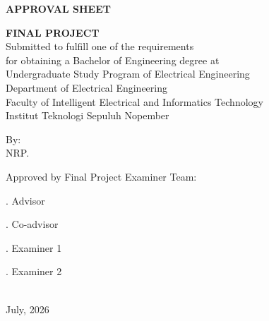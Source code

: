 \begin{center}
  \large
  \textbf{APPROVAL SHEET}
\end{center}

\thispagestyle{empty}

\begin{center}
  \textbf{\engtatitle{}}
\end{center}

\begingroup
\small

\begin{center}
  \textbf{FINAL PROJECT}
  \\Submitted to fulfill one of the requirements \\
  for obtaining a Bachelor of Engineering degree at \\
  Undergraduate Study Program of Electrical Engineering \\
  Department of Electrical Engineering \\
  Faculty of Intelligent Electrical and Informatics Technology \\
  Institut Teknologi Sepuluh Nopember
\end{center}

\begin{center}
  By: \textbf{\MakeUppercase{\name{}}}
  \\NRP. \nrp{}
\end{center}

\vspace{3ex}

\begin{center}
  Approved by Final Project Examiner Team:
\end{center}

\vspace{2ex}

. \advisor{} \hfill Advisor

\vspace{2ex}
. \coadvisor{} \hfill Co-advisor

\vspace{2ex}
. \examinerone{} \hfill Examiner 1

\vspace{2ex}
. \examinertwo{} \hfill Examiner 2

\vspace{6ex}

\begin{center}
  \textbf{\MakeUppercase{\place{}}}
  \\July, 2026
\end{center}
\endgroup
